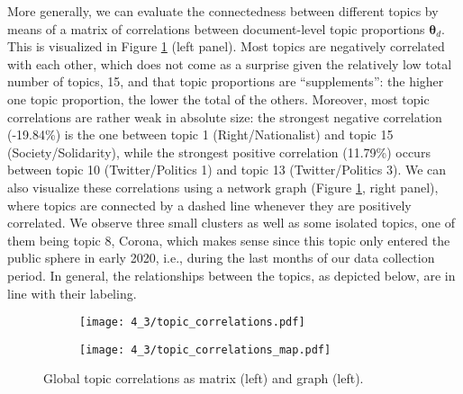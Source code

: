 \documentclass[12pt]{article}
\begin{document}
More generally, we can evaluate the connectedness between different topics by means of a matrix of correlations between document-level topic proportions $\boldsymbol{\theta}_d$. This is visualized in Figure \ref{fig:topic_correlations} (left panel). Most topics are negatively correlated with each other, which does not come as a surprise given the relatively low total number of topics, 15, and that topic proportions are “supplements”: the higher one topic proportion, the lower the total of the others. Moreover, most topic correlations are rather weak in absolute size: the strongest negative correlation (-19.84\%) is the one between topic 1 (Right/Nationalist) and topic 15 (Society/Solidarity), while the strongest positive correlation (11.79\%) occurs between topic 10 (Twitter/Politics 1) and topic 13 (Twitter/Politics 3). We can also visualize these correlations using a network graph (Figure \ref{fig:topic_correlations}, right panel), where topics are connected by a dashed line whenever they are positively correlated. We observe three small clusters as well as some isolated topics, one of them being topic 8, Corona, which makes sense since this topic only entered the public sphere in early 2020, i.e., during the last months of our data collection period. In general, the relationships between the topics, as depicted below, are in line with their labeling.

\begin{figure}[h!]
  \centering
  \captionsetup{justification=centering,margin=2cm}
  \begin{subfigure}[b]{0.4\linewidth}
    \texttt{[image: 4\_3/topic\_correlations.pdf]}
  \end{subfigure}
  \begin{subfigure}[b]{0.4\linewidth}
    \texttt{[image: 4\_3/topic\_correlations\_map.pdf]}
  \end{subfigure}
  \caption{Global topic correlations as matrix (left) and graph (left).}
  \label{fig:topic_correlations}
\end{figure}



\end{document}

